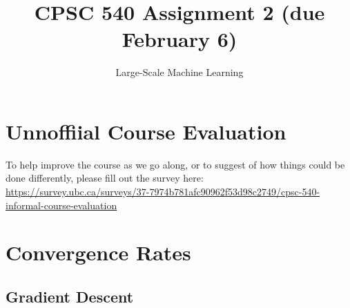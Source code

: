 \documentclass{article}
\begin{document}
\def\blu#1{{\color{blu}#1}}
\def\gre#1{{\color{gre}#1}}
\def\red#1{{\color{red}#1}}
\def\norm#1{\|#1\|}
\newcommand{\argmin}[1]{\mathop{\hbox{argmin}}_{#1}}
\newcommand{\argmax}[1]{\mathop{\hbox{argmax}}_{#1}}
\def\R{\mathbb{R}}
\newcommand{\fig}[2]{\texttt{[image: a2f/\#2]}}
\newcommand{\centerfig}[2]{\begin{center}\texttt{[image: a2f/\#2]}\end{center}}
\def\items#1{\begin{itemize}#1\end{itemize}}
\def\enum#1{\begin{enumerate}#1\end{enumerate}}
\def\argmax{\mathop{\rm arg\,max}}
\def\argmin{\mathop{\rm arg\,min}}
\def\half{\frac 1 2}
\newcommand{\code}[1]{}
\newcommand{\alignStar}[1]{\begin{align*}#1\end{align*}}


\title{CPSC 540 Assignment 2 (due February 6)}
\author{Large-Scale Machine Learning}
\date{}
\maketitle

\setcounter{section}{-1}
\section{Unnoffiial Course Evaluation}

To help improve the course as we go along, or to suggest of how things could be done differently, please fill out the survey here:\\
\url{https://survey.ubc.ca/surveys/37-7974b781afc90962f53d98c2749/cpsc-540-informal-course-evaluation}

\section{Convergence Rates}

\subsection{Gradient Descent}
\end{document}
